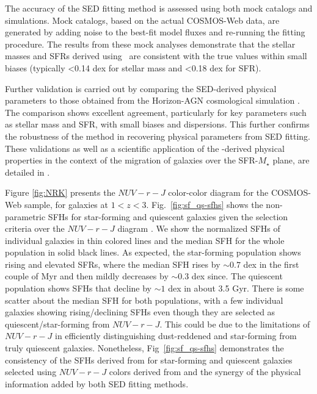 \documentclass[longauth]{aa}
\begin{document}
The accuracy of the SED fitting method is assessed using both mock catalogs and simulations. Mock catalogs, based on the actual COSMOS-Web data, are generated by adding noise to the best-fit model fluxes and re-running the fitting procedure. The results from these mock analyses demonstrate that the stellar masses and SFRs derived using \cigale\ are consistent with the true values within small biases (typically <0.14 dex for stellar mass and <0.18 dex for SFR). 

Further validation is carried out by comparing the SED-derived physical parameters to those obtained from the Horizon-AGN cosmological simulation \citep{Dubois2014}. The comparison shows excellent agreement, particularly for key parameters such as stellar mass and SFR, with small biases and dispersions. This further confirms the robustness of the \cigale{} method in recovering physical parameters from SED fitting. These validations as well as a scientific application of the \cigale-derived physical properties in the context of the migration of galaxies over the SFR-$M_\star$ plane, are detailed in \citet[][Section 4.2]{Arango-Toro2024}.

Figure \ref{fig:NRK} presents the \lephare{} $NUV-r-J$ color-color diagram for the COSMOS-Web sample, for galaxies at $1<z<3$. Fig.~\ref{fig:sf_qs-sfhs} shows the \cigale{} non-parametric SFHs for star-forming and quiescent galaxies given the selection criteria over the $NUV-r-J$ diagram \citep{ilbert_mass_2013} . We show the normalized SFHs of individual galaxies in thin colored lines and the median SFH for the whole population in solid black lines. As expected, the star-forming population shows rising and elevated SFRs, where the median SFH rises by $\sim0.7$ dex in the first couple of Myr and then mildly decreases by $\sim 0.3$ dex since. The quiescent population shows SFHs that decline by $\sim1$ dex in about 3.5 Gyr. There is some scatter about the median SFH for both populations, with a few individual galaxies showing rising/declining SFHs even though they are selected as quiescent/star-forming from $NUV-r-J$. This could be due to the limitations of $NUV-r-J$ in efficiently distinguishing dust-reddened and star-forming from truly quiescent galaxies.
Nonetheless, Fig~\ref{fig:sf_qs-sfhs} demonstrates the consistency of the SFHs derived from \cigale{} for star-forming and quiescent galaxies selected using $NUV-r-J$ colors derived from \lephare{} and the synergy of the physical information added by both SED fitting methods. 
\end{document}
